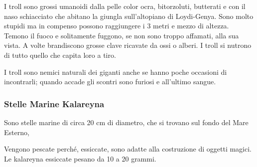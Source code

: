 I troll sono grossi umanoidi dalla pelle color ocra, bitorzoluti,
butterati e con il naso schiacciato che abitano la giungla
sull'altopiano di Loydi-Genya. Sono molto stupidi ma in compenso
possono raggiungere i 3 metri e mezzo di altezza.  Temono il fuoco e
solitamente fuggono, se non sono troppo affamati, alla sua vista.  A
volte brandiscono grosse clave ricavate da ossi o alberi.  I troll si
nutrono di tutto quello che capita loro a tiro.

I troll sono nemici naturali dei giganti anche se hanno poche
occasioni di incontrarli; quando accade gli scontri sono furiosi e
all'ultimo sangue.

\subsubsection{Stelle Marine Kalareyna}

Sono stelle marine di circa 20 cm di diametro, che si trovano sul
fondo del Mare Esterno, 

Vengono pescate perch\'e, essiccate, sono adatte alla costruzione di
oggetti magici. Le kalareyna essiccate pesano da 10 a 20 grammi.

{

}
\fi
